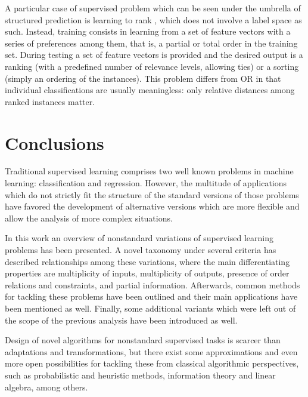 \documentclass[
	fontsize=11pt, %
	twoside=false, %
	open=any, %
	secnumdepth=1, %
]{kaobook}
\begin{document}
A particular case of supervised problem which can be seen under the umbrella of structured prediction is learning to rank \cite{ltr}, which does not involve a label space as such. Instead, training consists in learning from a set of feature vectors with a series of preferences among them, that is, a partial or total order in the training set. During testing a set of feature vectors is provided and the desired output is a ranking (with a predefined number of relevance levels, allowing ties) or a sorting (simply an ordering of the instances). This problem differs from OR in that individual classifications are usually meaningless: only relative distances among ranked instances matter.

\section{Conclusions}
\label{sec:conclusions}

Traditional supervised learning comprises two well known problems in machine learning: classification and regression. However, the multitude of applications which do not strictly fit the structure of the standard versions of those problems have favored the development of alternative versions which are more flexible and allow the analysis of more complex situations. 

In this work an overview of nonstandard variations of supervised learning problems has been presented. A novel taxonomy under several criteria has described relationships among these variations, where the main differentiating properties are multiplicity of inputs, multiplicity of outputs, presence of order relations and constraints, and partial information. Afterwards, common methods for tackling these problems have been outlined and their main applications have been mentioned as well. Finally, some additional variants which were left out of the scope of the previous analysis have been introduced as well.

Design of novel algorithms for nonstandard supervised tasks is scarcer than adaptations and transformations, but there exist some approximations and even more open possibilities for tackling these from classical algorithmic perspectives, such as probabilistic and heuristic methods, information theory and linear algebra, among others. 

\end{document}
